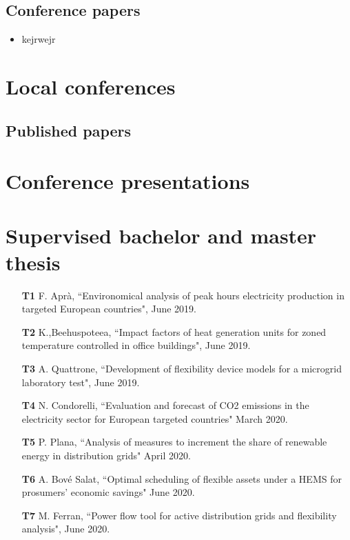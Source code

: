 \subsection*{Conference papers}

\begin{itemize}

\item kejrwejr
	
\end{itemize}

\section*{Local conferences}

\subsection*{Published papers}



\section*{Conference presentations}



\section*{Supervised bachelor and master thesis}

\begin{itemize}
	\item [\textbf{T1}] F. Apr\`{a}, ``Environomical analysis of peak hours electricity production in targeted European countries", June 2019.
	\item [\textbf{T2}] K.,Beehuspoteea,  ``Impact factors of heat generation units for zoned temperature controlled in office buildings", June 2019.
	\item [\textbf{T3}] A. Quattrone, ``Development of flexibility device models for a microgrid laboratory test", June 2019. 
	\item [\textbf{T4}] N. Condorelli, ``Evaluation and forecast of CO2 emissions in the
electricity sector for European targeted countries" March 2020.
	\item [\textbf{T5}] P. Plana, ``Analysis of measures to increment the share of renewable energy in distribution grids" April 2020.
	\item [\textbf{T6}] A. Bov\'{e} Salat, ``Optimal scheduling of flexible assets under a HEMS for prosumers' economic savings" June 2020. 
	\item [\textbf{T7}] M. Ferran, ``Power flow tool for active distribution grids and flexibility analysis", June 2020. 
	 
	
	
	

\end{itemize}

